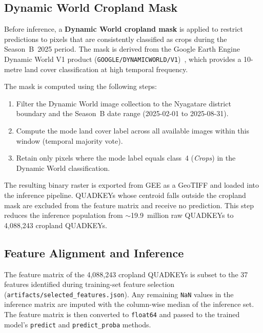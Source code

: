 \subsection{Dynamic World Cropland Mask}
\label{subsec:dw_mask}

Before inference, a \textbf{Dynamic World cropland mask} is applied to
restrict predictions to pixels that are consistently classified as crops
during the Season~B~2025 period. The mask is derived from the Google
Earth Engine Dynamic World V1 product
(\texttt{GOOGLE/DYNAMICWORLD/V1})~\cite{brown2022dynamic}, which provides
a 10-metre land cover classification at high temporal frequency.

The mask is computed using the following steps:
\begin{enumerate}
    \item Filter the Dynamic World image collection to the Nyagatare
          district boundary and the Season~B date range
          (2025-02-01 to 2025-08-31).
    \item Compute the mode land cover label across all available images
          within this window (temporal majority vote).
    \item Retain only pixels where the mode label equals class~4
          (\textit{Crops}) in the Dynamic World classification.
\end{enumerate}
The resulting binary raster is exported from GEE as a GeoTIFF and loaded
into the inference pipeline. QUADKEYs whose centroid falls outside the
cropland mask are excluded from the feature matrix and receive no
prediction. This step reduces the inference population from
$\sim$19.9~million raw QUADKEYs to 4,088,243 cropland QUADKEYs.


\subsection{Feature Alignment and Inference}
\label{subsec:inference_predict}

The feature matrix of the 4,088,243 cropland QUADKEYs is subset to the
37 features identified during training-set feature selection
(\texttt{artifacts/selected\_features.json}). Any remaining \texttt{NaN}
values in the inference matrix are imputed with the column-wise median of
the inference set. The feature matrix is then converted to \texttt{float64}
and passed to the trained model's \texttt{predict} and
\texttt{predict\_proba} methods.


